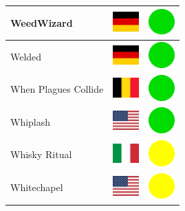 \documentclass[12pt, a4paper, twoside]{report}
\begin{document}
\begin{center}
\begin{longtable}{|p{5cm}|p{2cm}|p{2cm}|}
 WeedWizard                                                 & \includegraphics[width=1cm]{../img/flags/de} &   \includegraphics[width=1cm]{../likes/y} \\ \hline
 Welded                                                     & \includegraphics[width=1cm]{../img/flags/de} &   \includegraphics[width=1cm]{../likes/y} \\ \hline
 When Plagues Collide                                       & \includegraphics[width=1cm]{../img/flags/be} &   \includegraphics[width=1cm]{../likes/y} \\ \hline
 Whiplash                                                   & \includegraphics[width=1cm]{../img/flags/us} &   \includegraphics[width=1cm]{../likes/y} \\ \hline
 Whisky Ritual                                              & \includegraphics[width=1cm]{../img/flags/it} &   \includegraphics[width=1cm]{../likes/m} \\ \hline
 Whitechapel                                                & \includegraphics[width=1cm]{../img/flags/us} &   \includegraphics[width=1cm]{../likes/m} \\ \hline

\end{longtable}
\end{center}
\end{document}
